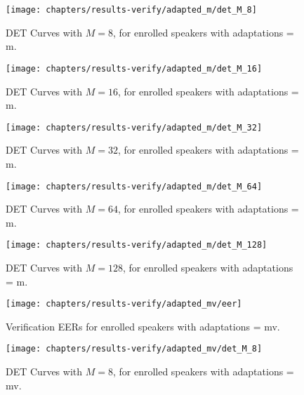\newpage
\begin{figure}[ht]
	\centering
	\texttt{[image: chapters/results-verify/adapted\_m/det\_M\_8]}
	\caption{DET Curves with $M = 8$, for enrolled speakers with adaptations = m.}
	\label{fig:results-verify-adapted_m-M_8}
\end{figure}

\begin{figure}[ht]
	\centering
	\texttt{[image: chapters/results-verify/adapted\_m/det\_M\_16]}
	\caption{DET Curves with $M = 16$, for enrolled speakers with adaptations = m.}
	\label{fig:results-verify-adapted_m-M_16}
\end{figure}

\newpage
\begin{figure}[ht]
	\centering
	\texttt{[image: chapters/results-verify/adapted\_m/det\_M\_32]}
	\caption{DET Curves with $M = 32$, for enrolled speakers with adaptations = m.}
	\label{fig:results-verify-adapted_m-M_32}
\end{figure}

\begin{figure}[ht]
	\centering
	\texttt{[image: chapters/results-verify/adapted\_m/det\_M\_64]}
	\caption{DET Curves with $M = 64$, for enrolled speakers with adaptations = m.}
	\label{fig:results-verify-adapted_m-M_64}
\end{figure}

\newpage
\begin{figure}[ht]
	\centering
	\texttt{[image: chapters/results-verify/adapted\_m/det\_M\_128]}
	\caption{DET Curves with $M = 128$, for enrolled speakers with adaptations = m.}
	\label{fig:results-verify-adapted_m-M_128}
\end{figure}

\clearpage

\newpage


\begin{figure}[ht]
	\centering
	\texttt{[image: chapters/results-verify/adapted\_mv/eer]}
	\caption{Verification EERs for enrolled speakers with adaptations = mv.}
	\label{fig:results-verify-adapted_mv}
\end{figure}

\newpage
\begin{figure}[ht]
	\centering
	\texttt{[image: chapters/results-verify/adapted\_mv/det\_M\_8]}
	\caption{DET Curves with $M = 8$, for enrolled speakers with adaptations = mv.}
	\label{fig:results-verify-adapted_mv-M_8}
\end{figure}

